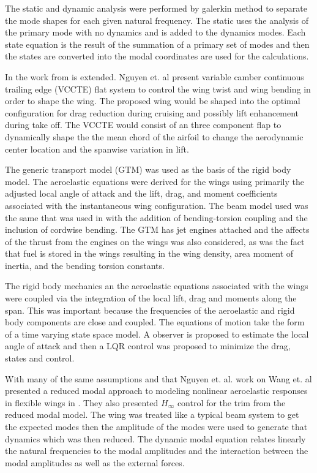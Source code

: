 \documentclass[11pt]{ucthesis}
\begin{document}
The static and dynamic analysis were performed by galerkin method to separate the mode shapes for each given natural frequency. The static uses the analysis of the primary mode with no dynamics and is added to the dynamics modes. Each state equation is the result of the summation of a primary set of modes and then the states are converted into the modal coordinates are used for the calculations.

In \cite{nguyen2012aeroelastic} the work from \cite{nguyencoupled} is extended. Nguyen et. al present variable camber continuous trailing edge (VCCTE) flat system to control the wing twist and wing bending in order to shape the wing. The proposed wing would be shaped into the optimal configuration for drag reduction during cruising and possibly lift enhancement during take off. The VCCTE would consist of an three component flap to dynamically shape the the mean chord of the airfoil to change the aerodynamic center location and the spanwise variation in lift.

The generic transport model (GTM) was used as the basis of the rigid body model. The aeroelastic equations were derived for the wings using primarily the adjusted local angle of attack and the lift, drag, and moment coefficients associated with the instantaneous wing configuration. The beam model used was the same that was used in \cite{nguyencoupled} with the addition of bending-torsion coupling and the inclusion of cordwise bending. The GTM has jet engines attached and the affects of the thrust from the engines on the wings was also considered, as was the fact that fuel is stored in the wings resulting in the wing density, area moment of inertia, and the bending torsion constants.

The rigid body mechanics an the aeroelastic equations associated with the wings were coupled via the integration of the local lift, drag and moments along the span. This was important because the frequencies of the aeroelastic and rigid body components are close and coupled. The equations of motion take the form of a time varying state space model. A observer is proposed to estimate the local angle of attack and then a LQR control was proposed to minimize the drag, states and control.

With many of the same assumptions and that Nguyen et. al. work on Wang et. al presented a reduced modal approach to modeling nonlinear aeroelastic responses in flexible wings in \cite{wang2014nonlinear}. They also presented $H_{\infty}$ control for the trim from the reduced modal model. The wing was treated like a typical beam system to get the expected modes then the amplitude of the modes were used to generate that dynamics which was then reduced. The dynamic modal equation relates linearly the natural frequencies to the modal amplitudes and the interaction between the modal amplitudes as well as the external forces.
\end{document}
